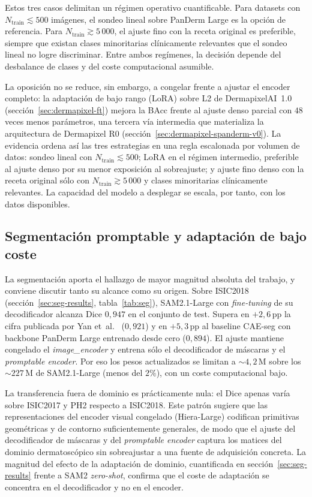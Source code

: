 Estos tres casos delimitan un régimen operativo cuantificable. Para
datasets con $N_{\mathrm{train}} \lesssim 500$ imágenes, el sondeo
lineal sobre PanDerm Large es la opción de referencia. Para
$N_{\mathrm{train}} \gtrsim 5\,000$, el ajuste fino con la receta
original es preferible, siempre que existan clases minoritarias
clínicamente relevantes que el sondeo lineal no logre discriminar.
Entre ambos regímenes, la decisión depende del desbalance de clases
y del coste computacional asumible.

La oposición no se reduce, sin embargo, a congelar frente a ajustar el
encoder completo: la adaptación de bajo rango (LoRA) sobre L2 de
DermapixelAI~1.0 (sección~\ref{sec:dermapixel-ft}) mejora la BAcc frente
al ajuste denso parcial con $48$ veces menos parámetros, una tercera vía
intermedia que materializa la arquitectura de Dermapixel R0
(sección~\ref{sec:dermapixel-spanderm-v0}). La evidencia ordena así las
tres estrategias en una regla escalonada por volumen de datos: sondeo
lineal con $N_{\mathrm{train}} \lesssim 500$; LoRA en el régimen
intermedio, preferible al ajuste denso por su menor exposición al
sobreajuste; y ajuste fino denso con la receta original sólo con
$N_{\mathrm{train}} \gtrsim 5\,000$ y clases minoritarias clínicamente
relevantes. La capacidad del modelo a desplegar se escala, por tanto,
con los datos disponibles.

\subsection{Segmentación promptable y adaptación de bajo coste}
\label{sec:disc-segmentacion}

La segmentación aporta el hallazgo de mayor magnitud absoluta del
trabajo, y conviene discutir tanto su alcance como su origen. Sobre
ISIC2018 (sección~\ref{sec:seg-results}, tabla~\ref{tab:seg}),
SAM2.1-Large con \emph{fine-tuning} de su decodificador alcanza
Dice $0{,}947$ en el conjunto de test. Supera en $+2{,}6$\,pp la
cifra publicada por Yan et~al.~\cite{panderm2025} ($0{,}921$) y
en $+5{,}3$\,pp al baseline CAE-seg con backbone PanDerm Large
entrenado desde cero ($0{,}894$). El ajuste mantiene congelado el
\emph{image\_encoder} y entrena sólo el decodificador de máscaras y
el \emph{promptable encoder}. Por eso los pesos actualizados se
limitan a $\sim 4{,}2$\,M sobre los $\sim 227$\,M de
SAM2.1-Large (menos del $2\%$), con un coste computacional bajo.

La transferencia fuera de dominio es prácticamente nula: el Dice apenas
varía sobre ISIC2017 y PH2 respecto a ISIC2018. Este patrón sugiere que
las representaciones del encoder visual congelado (Hiera-Large) codifican
primitivas geométricas y de contorno suficientemente generales, de modo
que el ajuste del decodificador de máscaras y del \emph{promptable
encoder} captura los matices del dominio dermatoscópico sin sobreajustar a
una fuente de adquisición concreta. La magnitud del efecto de la
adaptación de dominio, cuantificada en sección~\ref{sec:seg-results}
frente a SAM2 \emph{zero-shot}, confirma que el coste de adaptación se
concentra en el decodificador y no en el encoder.

